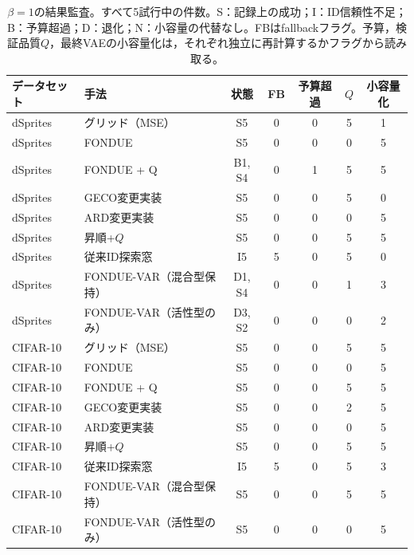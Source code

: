 \documentclass[11pt,a4paper]{ltjsarticle}
\begin{document}
\begin{table}[H]
\caption{$\beta=1$の結果監査。すべて5試行中の件数。S：記録上の成功；I：ID信頼性不足；B：予算超過；D：退化；N：小容量の代替なし。FBはfallbackフラグ。予算，検証品質$Q$，最終VAEの小容量化は，それぞれ独立に再計算するかフラグから読み取る。}\label{tab:outcomes1}
\footnotesize
\setlength{\tabcolsep}{3.5pt}
\begin{tabular*}{\textwidth}{@{\extracolsep{\fill}}llccccc@{}}
\toprule
データセット & 手法 & 状態 & FB & 予算超過 & $Q$ & 小容量化 \\
\midrule
dSprites & グリッド（MSE） & S5 & 0 & 0 & 5 & 1 \\
dSprites & FONDUE & S5 & 0 & 0 & 0 & 5 \\
dSprites & FONDUE + Q & B1, S4 & 0 & 1 & 5 & 5 \\
dSprites & GECO変更実装 & S5 & 0 & 0 & 5 & 0 \\
dSprites & ARD変更実装 & S5 & 0 & 0 & 0 & 5 \\
dSprites & 昇順+$Q$ & S5 & 0 & 0 & 5 & 5 \\
dSprites & 従来ID探索窓 & I5 & 5 & 0 & 5 & 0 \\
dSprites & FONDUE-VAR（混合型保持） & D1, S4 & 0 & 0 & 1 & 3 \\
dSprites & FONDUE-VAR（活性型のみ） & D3, S2 & 0 & 0 & 0 & 2 \\
CIFAR-10 & グリッド（MSE） & S5 & 0 & 0 & 5 & 5 \\
CIFAR-10 & FONDUE & S5 & 0 & 0 & 0 & 5 \\
CIFAR-10 & FONDUE + Q & S5 & 0 & 0 & 5 & 5 \\
CIFAR-10 & GECO変更実装 & S5 & 0 & 0 & 2 & 5 \\
CIFAR-10 & ARD変更実装 & S5 & 0 & 0 & 0 & 5 \\
CIFAR-10 & 昇順+$Q$ & S5 & 0 & 0 & 5 & 5 \\
CIFAR-10 & 従来ID探索窓 & I5 & 5 & 0 & 5 & 3 \\
CIFAR-10 & FONDUE-VAR（混合型保持） & S5 & 0 & 0 & 5 & 5 \\
CIFAR-10 & FONDUE-VAR（活性型のみ） & S5 & 0 & 0 & 0 & 5 \\
\bottomrule
\end{tabular*}
\end{table}
\end{document}
